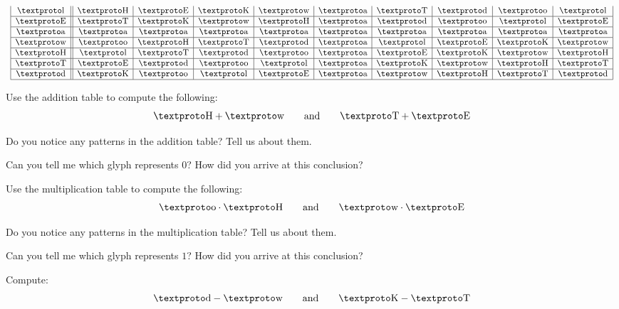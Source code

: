 \begin{fullwidth}
\[{\begin{array}{clc}
{\begin{array}{|c||c|c|c|c|c|c|c|c|c|}
\lh   & \lb & \lf & \ld & \la & \lo & \lc &\loo & \li & \lh \\ \hline
\lf   & \lc & \ld & \la & \lb & \lo &\loo & \li & \lh & \lf \\ \hline
\lo   & \lo & \lo & \lo & \lo & \lo & \lo & \lo & \lo & \lo \\ \hline
\la   & \li & \lb & \lc &\loo & \lo & \lh & \lf & \ld & \la \\ \hline
\lb   & \lh & \lc &\loo & \li & \lo & \lf & \ld & \la & \lb \\ \hline
\lc   & \lf &\loo & \li & \lh & \lo & \ld & \la & \lb & \lc \\ \hline
\loo  & \ld & \li & \lh & \lf & \lo & \la & \lb & \lc &\loo \\ \hline
\end{array}}
\end{array}}
\]
\end{fullwidth}
\newpage

\begin{prob} 
Use the addition table to compute the following:
\[
\lb + \la \qquad\text{and}\qquad \lc + \lf
\]
\end{prob}

\begin{prob} 
Do you notice any patterns in the addition table? Tell us about them.
\end{prob}

\begin{prob} 
Can you tell me which glyph represents $0$? How did you arrive at this
conclusion?
\end{prob}

\begin{prob} 
Use the multiplication table to compute the following:
\[
\li \cdot \lb \qquad\text{and}\qquad \la \cdot \lf
\]
\end{prob}

\begin{prob} 
Do you notice any patterns in the multiplication table? Tell us about them.
\end{prob}

\begin{prob} 
Can you tell me which glyph represents $1$? How did you arrive at this
conclusion?
\end{prob}


\begin{prob} Compute:
\[
\loo - \la \qquad\text{and}\qquad \ld - \lc
\]
\end{prob}



